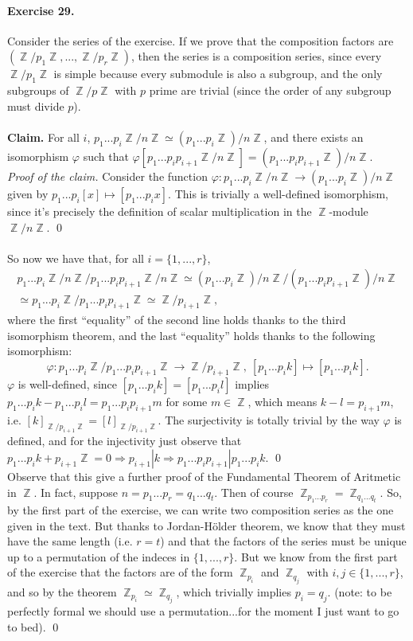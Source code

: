\documentclass[12pt,a4paper]{report}
\theoremstyle{definition}
\theoremstyle{num.custom-title}
\DeclareMathOperator{\Z}{\mathbb{Z}}
\DeclareMathOperator{\imp}{\Rightarrow}
\renewcommand{\phi}{\varphi}
\begin{document}
\paragraph{Exercise 29.} Consider the series of the exercise. If we prove that the composition factors are $(\Z/p_1\Z, ..., \Z/p_r\Z)$, then the series is a composition series, since every $\Z/p_1\Z$ is simple because every submodule is also a subgroup, and the only subgroups of $\Z/p\Z$ with $p$ prime are trivial (since the order of any subgroup must divide $p$).\\
\\
\noindent\textbf{Claim.} For all $i$, $p_1...p_i \Z/n\Z \simeq (p_1...p_i\Z)/n\Z$, and there exists an isomorphism $\phi$ such that $\phi[p_1...p_i p_{i+1} \Z/n\Z] = (p_1...p_i p_{i+1} \Z)/n\Z$.\\
\emph{Proof of the claim.} Consider the function $\phi: p_1...p_i \Z/n\Z \to (p_1...p_i\Z)/n\Z$ given by $p_1...p_i [x] \mapsto [p_1...p_i x]$. This is trivially a well-defined isomorphism, since it's precisely the definition of scalar multiplication in the $\Z$-module $\Z/n\Z$. \qed
\\
\\
So now we have that, for all $i=\{1,...,r\}$, 
\begin{multline*}
p_1...p_i \Z/n\Z / p_1...p_i p_{i+1} \Z/n\Z \simeq (p_1...p_i \Z)/n\Z / (p_1...p_i p_{i+1} \Z)/n\Z \\
\simeq p_1...p_i \Z / p_1...p_i p_{i+1} \Z \simeq \Z/p_{i+1}\Z,
\end{multline*}
where the first ``equality'' of the second line holds thanks to the third isomorphism theorem, and the last ``equality'' holds thanks to the following isomorphism:
\[
\phi: p_1...p_i \Z / p_1...p_i p_{i+1} \Z \to \Z/p_{i+1}\Z, \ [p_1...p_i k] \mapsto [p_1...p_i k].
\]
$\phi$ is well-defined, since $[p_1...p_i k] = [p_1...p_i l]$ implies $p_1...p_i k - p_1...p_i l = p_1...p_i p_{i+1} m$ for some $m \in \Z$, which means $k-l=p_{i+1} m$, i.e. $[k]_{\Z/p_{i+1}\Z} = [l]_{\Z/p_{i+1}\Z}$. The surjectivity is totally trivial by the way $\phi$ is defined, and for the injectivity just observe that $p_1...p_i k + p_{i+1}\Z = 0 \imp p_{i+1}|k \imp p_1...p_i p_{i+1} | p_1...p_i k$. \qed \\
Observe that this give a further proof of the Fundamental Theorem of Aritmetic in $\Z$. In fact, suppose $n=p_1...p_r=q_1...q_t$. Then of course $\Z_{p_1...p_r} = \Z_{q_1...q_t}$. So, by the first part of the exercise, we can write two composition series as the one given in the text. But thanks to Jordan-Hölder theorem, we know that they must have the same length (i.e. $r=t$) and that the factors of the series must be unique up to a permutation of the indeces in $\{1,...,r\}$. But we know from the first part of the exercise that the factors are of the form $\Z_{p_i}$ and $\Z_{q_j}$ with $i,j \in \{1,...,r\}$, and so by the theorem $\Z_{p_i} \simeq \Z_{q_j}$, which trivially implies $p_i=q_j$. (note: to be perfectly formal we should use a permutation...for the moment I just want to go to bed). \qed
\end{document}
